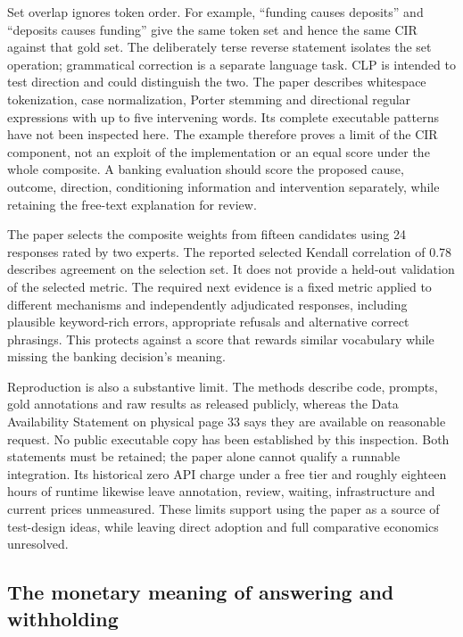 Set overlap ignores token order. For example, ``funding causes deposits'' and
``deposits causes funding'' give the same token set and hence the same CIR
against that gold set. The deliberately terse reverse statement isolates the
set operation; grammatical correction is a separate language task. CLP is
intended to test direction and could distinguish the two. The paper describes
whitespace tokenization, case normalization, Porter stemming and directional
regular expressions with up to five intervening words. Its complete executable
patterns have not been inspected here. The example therefore proves a limit
of the CIR component, not an exploit of the implementation or an equal score
under the whole composite. A banking evaluation should score the proposed
cause, outcome, direction, conditioning information and intervention
separately, while retaining the free-text explanation for review.
\citep{exec17_benchmark_cherif,exec17_benchmark_exact}

The paper selects the composite weights from fifteen candidates using 24
responses rated by two experts. The reported selected Kendall correlation
of 0.78 describes agreement on the selection set. It does not provide a
held-out validation of the selected metric. The required next evidence is a
fixed metric applied to different mechanisms and independently adjudicated
responses, including plausible keyword-rich errors, appropriate refusals and
alternative correct phrasings. This protects against a score that rewards
similar vocabulary while missing the banking decision's meaning.
\citep{exec17_benchmark_cherif}

Reproduction is also a substantive limit. The methods describe code, prompts,
gold annotations and raw results as released publicly, whereas the Data
Availability Statement on physical page 33 says they are available on
reasonable request. No public executable copy has been established by this
inspection. Both statements must be retained; the paper alone cannot qualify
a runnable integration. Its historical zero API charge under a free tier and
roughly eighteen hours of runtime likewise leave annotation, review, waiting,
infrastructure and current prices unmeasured. These limits support using the
paper as a source of test-design ideas, while leaving direct adoption and full
comparative economics unresolved.~\citep{exec17_benchmark_cherif}

\subsection{The monetary meaning of answering and withholding}

